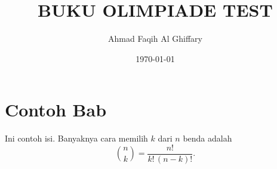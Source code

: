 \documentclass[12pt,a4paper]{book}
\title{BUKU OLIMPIADE TEST}
\author{Ahmad Faqih Al Ghiffary}
\date{\today}
\begin{document}
\maketitle
\tableofcontents

\chapter{Contoh Bab}
Ini contoh isi. Banyaknya cara memilih $k$ dari $n$ benda adalah
\[
  \binom{n}{k} = \frac{n!}{k!\,(n-k)!}.
\]
\end{document}
